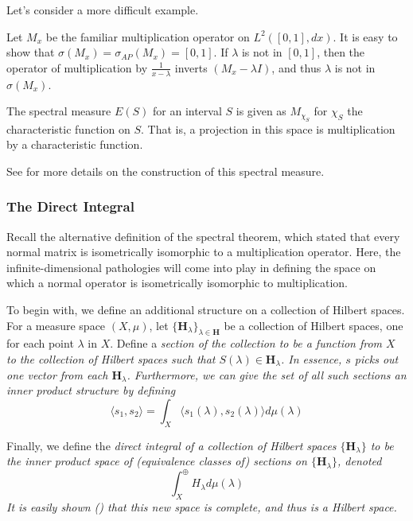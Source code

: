Let's consider a more difficult example.

    \begin{example}
        Let $M_x$ be the familiar multiplication operator on $L^2([0,1],dx)$.
        It is easy to show that $\sigma(M_x) = \sigma_{AP}(M_x) = [0,1]$. If
        $\lambda$ is not in $[0,1]$, then the operator of multiplication by
        $\frac{1}{x-\lambda}$ inverts $(M_x-\lambda I)$, and thus $\lambda$ is
        not in $\sigma(M_x)$.

        The spectral measure $E(S)$ for an interval $S$ is given as $M_{\chi_S}$
        for $\chi_S$ the characteristic function on $S$. That is, a projection
        in this space is multiplication by a characteristic function.

        See \cite[Ex. 6.11]{MacCluer2009} for more details on the construction of this
        spectral measure.
    \end{example}
\subsubsection{The Direct Integral}

Recall the alternative definition of the spectral theorem, which stated that
every normal matrix is isometrically isomorphic to a multiplication operator.
Here, the infinite-dimensional pathologies will come into play in defining the
space on which a normal operator is isometrically isomorphic to multiplication.

To begin with, we define an additional structure on a collection of Hilbert
spaces. For a measure space $(X,\mu)$, let
$\{\textbf{H}_{\lambda}\}_{\lambda\in\textbf{H}}$ be a collection of Hilbert
spaces, one for each point $\lambda$ in $X$. Define a \em section \em of the
collection to be a function from $X$ to the collection of Hilbert spaces such
that $S(\lambda) \in \textbf{H}_{\lambda}$. In essence, $s$ picks out one vector
from each $\textbf{H}_{\lambda}$. Furthermore, we can give the set of all such
sections an inner product structure by defining
\[
    \langle s_1,s_2 \rangle = \int_X \langle s_1(\lambda),s_2(\lambda)\rangle
    d\mu(\lambda)
\]

Finally, we define the \em direct integral \em of a collection of Hilbert spaces
$\{\textbf{H}_{\lambda}\}$ to be the inner product space of (equivalence classes
of) sections on $\{\textbf{H}_{\lambda}\}$, denoted
\[
    \int_X^{\oplus}H_\lambda d\mu(\lambda)
\]
It is easily shown (\cite[Ch. 7.3]{Hall2013})
that this new space is complete, and thus is a Hilbert space.

